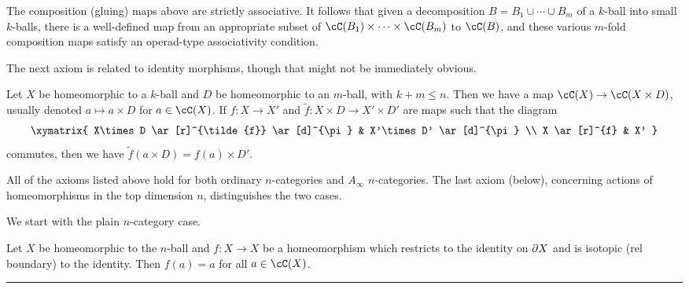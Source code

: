 {The composition (gluing) maps above are strictly associative.
It follows that given a decomposition $B = B_1\cup\cdots\cup B_m$ of a $k$-ball
into small $k$-balls, there is a well-defined
map from an appropriate subset of $\cC(B_1)\times\cdots\times\cC(B_m)$ to $\cC(B)$,
and these various $m$-fold composition maps satisfy an
operad-type associativity condition.}


The next axiom is related to identity morphisms, though that might not be immediately obvious.

{Let $X$ be homeomorphic to a $k$-ball and $D$ be homeomorphic to an $m$-ball, with $k+m \le n$.
Then we have a map $\cC(X)\to \cC(X\times D)$, usually denoted $a\mapsto a\times D$ for $a\in \cC(X)$.
If $f:X\to X'$ and $\tilde{f}:X\times D \to X'\times D'$ are maps such that the diagram
\[ \xymatrix{
	X\times D \ar[r]^{\tilde{f}} \ar[d]^{\pi} & X'\times D' \ar[d]^{\pi} \\
	X \ar[r]^{f} & X'
} \]
commutes, then we have $\tilde{f}(a\times D) = f(a)\times D'$.}


All of the axioms listed above hold for both ordinary $n$-categories and $A_\infty$ $n$-categories.
The last axiom (below), concerning actions of 
homeomorphisms in the top dimension $n$, distinguishes the two cases.

We start with the plain $n$-category case.

{Let $X$ be homeomorphic to the $n$-ball and $f: X\to X$ be a homeomorphism which restricts
to the identity on $\partial X$ and is isotopic (rel boundary) to the identity.
Then $f(a) = a$ for all $a\in \cC(X)$.}





\medskip

\hrule

\medskip


